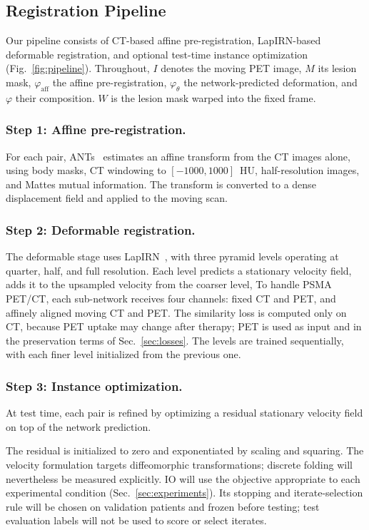 \subsection{Registration Pipeline}
\label{sec:pipeline}
Our pipeline consists of CT-based affine pre-registration, LapIRN-based deformable registration, and optional test-time instance optimization (Fig.~\ref{fig:pipeline}).
Throughout, $I$ denotes the moving PET image, $M$ its lesion mask, $\varphi_{\mathrm{aff}}$ the affine pre-registration, $\varphi_{\theta}$ the network-predicted deformation, and $\varphi$ their composition.
$W$ is the lesion mask warped into the fixed frame.

\subsubsection{Step 1: Affine pre-registration.}
For each pair, ANTs~\cite{ants} estimates an affine transform from the CT images alone, using body masks, CT windowing to $[-1000,1000]$~HU, half-resolution images, and Mattes mutual information.
The transform is converted to a dense displacement field and applied to the moving scan.

\subsubsection{Step 2: Deformable registration.}
The deformable stage uses LapIRN~\cite{ref_lapirn}, with three pyramid levels operating at quarter, half, and full resolution.
Each level predicts a stationary velocity field, adds it to the upsampled velocity from the coarser level, 
To handle PSMA PET/CT, each sub-network receives four channels: fixed CT and PET, and affinely aligned moving CT and PET.
The similarity loss is computed only on CT, because PET uptake may change after therapy; PET is used as input and in the preservation terms of Sec.~\ref{sec:losses}.
The levels are trained sequentially, with each finer level initialized from the previous one.

\subsubsection{Step 3: Instance optimization.}
At test time, each pair is refined by optimizing a residual stationary velocity field on top of the network prediction.
\begin{journaladdition}
The residual is initialized to zero and exponentiated by scaling and squaring.
The velocity formulation targets diffeomorphic transformations; discrete folding will nevertheless be measured explicitly.
IO will use the objective appropriate to each experimental condition (Sec.~\ref{sec:experiments}).
Its stopping and iterate-selection rule will be chosen on validation patients and frozen before testing; test evaluation labels will not be used to score or select iterates.
\end{journaladdition}


